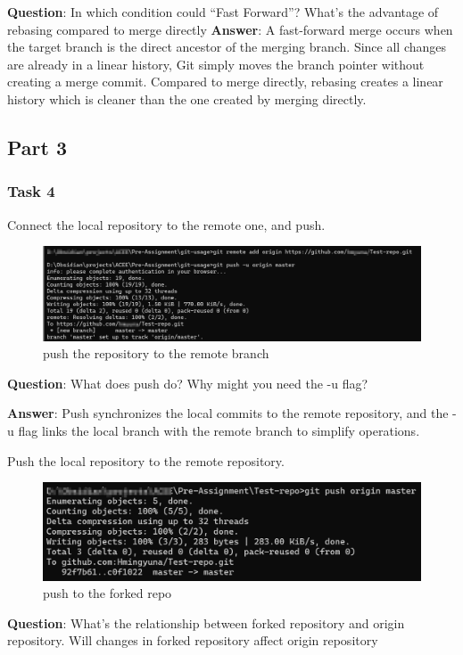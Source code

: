 \textbf{Question}:  In which condition could ``Fast Forward''? What's the advantage of rebasing compared to merge directly
\textbf{Answer}: A fast-forward merge occurs when the target branch is the direct ancestor of the merging branch.
Since all changes are already in a linear history, Git simply moves the branch pointer without creating a merge commit.
Compared to merge directly, rebasing creates a linear history which is cleaner than the one created by merging directly.

\subsection{Part 3}
\subsubsection{Task 4}
Connect the local repository to the remote one, and push.
\begin{figure}[H]
\centering
\includegraphics[width = \textwidth]{./figures/remote.png}
\caption{push the repository to the remote branch}
\end{figure}
\textbf{Question}: What does push do? Why might you need the -u flag?

\textbf{Answer}: Push synchronizes the local commits to the remote repository, and the -u flag links the local branch with the remote branch to simplify operations.

Push the local repository to the remote repository.
\begin{figure}[H]
\centering
\includegraphics[width = \textwidth]{./figures/push.png}
\caption{push to the forked repo}
\end{figure}
\textbf{Question}: What's the relationship between forked repository and origin repository. Will changes in forked repository affect origin repository

